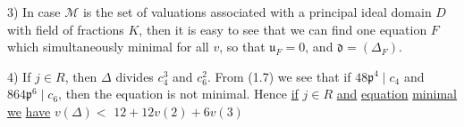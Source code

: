 3) In case $\mathscr{M}$ is the set of valuations associated with a principal ideal domain $D$ with field of fractions $K$, then it is easy to see that we can find one equation $F$ which simultaneously minimal for all $v$, so that $\mathfrak{u}_F=0$, and $\mathfrak{d}=(\Delta_F)$.

4) If $j\in R$, then $\Delta$ divides $c_4^3$ and $c_6^2$. From (1.7) we see that if $48\mathfrak{p}^4\mid c_4$ and $864\mathfrak{p}^6\mid c_6$, then the equation is not minimal. Hence \uline{if} $j\in R$ \uline{and} \uline{equation} \uline{minimal} \uline{we} \uline{have} $v(\Delta)<$  $12+12v(2)+6v(3)$

